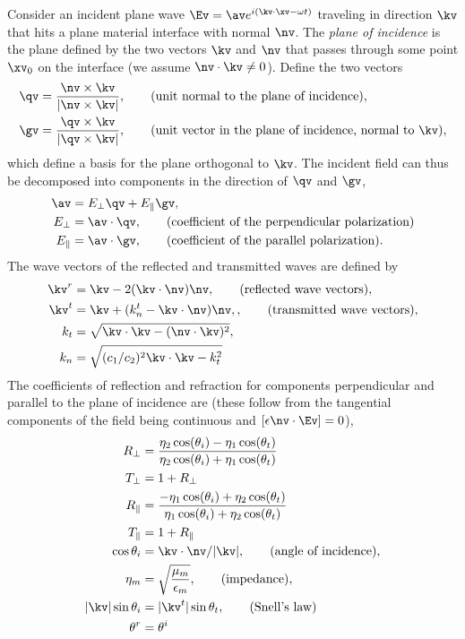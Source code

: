 \documentclass[11pt]{article}
\begin{document}
Consider an incident plane wave $\Ev = \av e^{i (\kv\cdot\xv - \omega t)}$ traveling in direction $\kv$ that
hits a plane material interface with normal $\nv$.
The {\em plane of incidence} is the plane defined by the two vectors $\kv$ and $\nv$ that
passes through some point $\xv_0$ on the interface (we assume $\nv\cdot\kv \ne 0$). 
Define the two vectors
\begin{align}
  \qv &= \frac{\nv \times \kv}{\vert \nv \times \kv \vert}, \qquad\text{(unit normal to the plane of incidence)},\\
  \gv &= \frac{\qv \times \kv}{\vert \qv \times \kv \vert}, \qquad\text{(unit vector in the plane of incidence, normal to $\kv$)},
\end{align}
which define a basis for the plane orthogonal to $\kv$. The incident field can thus be decomposed into
components in the direction of $\qv$ and $\gv$,
\begin{align}
  \av &= E_\perp \qv + E_\parallel \gv, \\
   E_\perp &= \av\cdot\qv,  \qquad\text{(coefficient of the perpendicular polarization)}\\
   E_\parallel &= \av\cdot\gv,  \qquad\text{(coefficient of the parallel polarization)} .
\end{align}
The wave vectors of the reflected and transmitted waves are defined by 
\begin{align}
  \kv^r &= \kv - 2 (\kv\cdot\nv)\nv , \qquad\text{(reflected wave vectors)}, \\
  \kv^t &= \kv + ( k_n^t - \kv\cdot\nv)\nv, , \qquad\text{(transmitted wave vectors)},\\
  k_t &= \sqrt{ \kv\cdot\kv - (\nv\cdot\kv)^2 } , \\
  k_n &= \sqrt{ (c_1/c_2)^2 \kv\cdot\kv  - k_t^2 }
\end{align}
The coefficients of reflection and refraction for components perpendicular and parallel to the plane of incidence are
(these follow from the tangential components of the field being continuous and $[ \epsilon \nv\cdot\Ev]=0$), 
\begin{align}
   R_\perp &= { \eta_2\cos(\theta_i) - \eta_1 \cos(\theta_t) \over \eta_2\cos(\theta_i) + \eta_1 \cos(\theta_t) } \\
   T_\perp &= 1 + R_\perp\\
   R_\parallel &= { -\eta_1\cos(\theta_i) + \eta_2 \cos(\theta_t) \over \eta_1\cos(\theta_i) + \eta_2 \cos(\theta_t) } \\
   T_\parallel &= 1 + R_\parallel\\
   \cos\theta_i &= \kv\cdot\nv/\vert \kv \vert, \qquad\text{(angle of incidence)}, \\
   \eta_m & = \sqrt{\frac{\mu_m}{\epsilon_m}} , \qquad\text{(impedance)}, \\
   \vert \kv \vert \sin\theta_i &= \vert \kv^t \vert \sin\theta_t, \qquad\text{(Snell's law)} \\
   \theta^r &= \theta^i 
\end{align}
\end{document}
